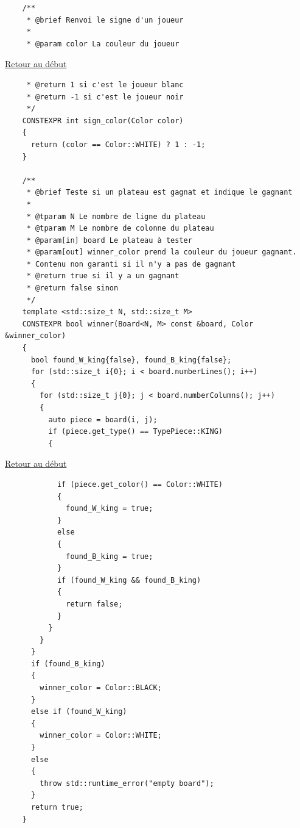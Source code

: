 {\begin{frame}[fragile]
\begin{verbatim}
    /**
     * @brief Renvoi le signe d'un joueur
     *
     * @param color La couleur du joueur
\end{verbatim}
\end{frame}

\begin{frame}[fragile]
\hyperlink{conclusion}{Retour au début}\newline
\begin{verbatim}
     * @return 1 si c'est le joueur blanc
     * @return -1 si c'est le joueur noir
     */
    CONSTEXPR int sign_color(Color color)
    {
      return (color == Color::WHITE) ? 1 : -1;
    }

    /**
     * @brief Teste si un plateau est gagnat et indique le gagnant
     *
     * @tparam N Le nombre de ligne du plateau
     * @tparam M Le nombre de colonne du plateau
     * @param[in] board Le plateau à tester
     * @param[out] winner_color prend la couleur du joueur gagnant.
     * Contenu non garanti si il n'y a pas de gagnant
     * @return true si il y a un gagnant
     * @return false sinon
     */
    template <std::size_t N, std::size_t M>
    CONSTEXPR bool winner(Board<N, M> const &board, Color &winner_color)
    {
      bool found_W_king{false}, found_B_king{false};
      for (std::size_t i{0}; i < board.numberLines(); i++)
      {
        for (std::size_t j{0}; j < board.numberColumns(); j++)
        {
          auto piece = board(i, j);
          if (piece.get_type() == TypePiece::KING)
          {
\end{verbatim}
\end{frame}

\begin{frame}[fragile]
\hyperlink{conclusion}{Retour au début}\newline
\begin{verbatim}
            if (piece.get_color() == Color::WHITE)
            {
              found_W_king = true;
            }
            else
            {
              found_B_king = true;
            }
            if (found_W_king && found_B_king)
            {
              return false;
            }
          }
        }
      }
      if (found_B_king)
      {
        winner_color = Color::BLACK;
      }
      else if (found_W_king)
      {
        winner_color = Color::WHITE;
      }
      else
      {
        throw std::runtime_error("empty board");
      }
      return true;
    }


\end{verbatim}
\end{frame}}
